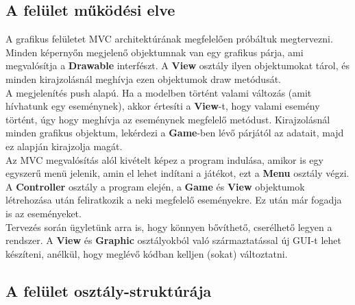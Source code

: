 \subsection{A felület működési elve}
A grafikus felületet MVC architektúrának megfelelően próbáltuk megtervezni. Minden képernyőn megjelenő objektumnak van egy grafikus párja, ami megvalósítja a \textbf{Drawable} interfészt. A \textbf{View} osztály ilyen objektumokat tárol, és minden kirajzolásnál meghívja ezen objektumok draw metódusát. \\
A megjelenítés push alapú. Ha a modelben történt valami változás (amit hívhatunk egy eseménynek), akkor értesíti a \textbf{View}-t, hogy valami esemény történt, úgy hogy meghívja az eseménynek megfelelő metódust. Kirajzolásnál minden grafikus objektum, lekérdezi a \textbf{Game}-ben lévő párjától az adatait, majd ez alapján kirajzolja magát.\\
Az MVC megvalósítás alól kivételt képez a program indulása, amikor is egy egyszerű menü jelenik, amin el lehet indítani a játékot, ezt a \textbf{Menu} osztály végzi.\\
A \textbf{Controller} osztály a program elején, a \textbf{Game} és \textbf{View} objektumok létrehozása után feliratkozik a neki megfelelő eseményekre. Ez után már fogadja is az eseményeket.\\
Tervezés során ügyletünk arra is, hogy könnyen bővíthető, cserélhető legyen a rendszer. A \textbf{View} és \textbf{Graphic} osztályokból való származtatással új GUI-t lehet készíteni, anélkül, hogy meglévő kódban kelljen (sokat) változtatni.

\subsection{A felület osztály-struktúrája}

